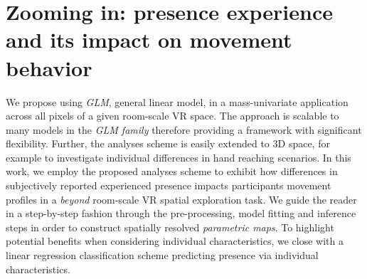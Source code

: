 \section{Zooming in: presence experience and its impact on movement behavior}
We propose using \textit{GLM}, general linear model, in a mass-univariate application across all pixels of a given room-scale VR space. The approach is scalable to many models in the \textit{GLM family} therefore providing a framework with significant flexibility. Further, the analyses scheme is easily extended to 3D space, for example to investigate individual differences in hand reaching scenarios. In this work, we employ the proposed analyses scheme to exhibit how differences in subjectively reported experienced presence impacts participants movement profiles in a \textit{beyond} room-scale VR spatial exploration task. We guide the reader in a step-by-step fashion through the pre-processing, model fitting and inference steps in order to construct spatially resolved \textit{parametric maps}. To highlight potential benefits when considering individual characteristics, we close with a linear regression classification scheme predicting presence via individual characteristics.

